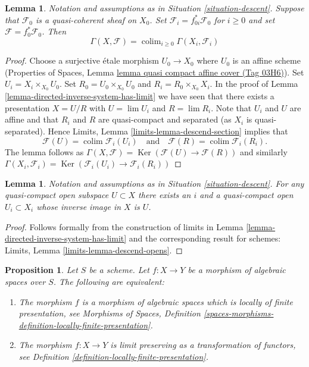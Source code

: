\documentclass{amsart}
\theoremstyle{plain}
\newtheorem{proposition}[subsection]{Proposition}
\newtheorem{lemma}[subsection]{Lemma}
\theoremstyle{definition}
\theoremstyle{remark}
\numberwithin{equation}{subsection}
\def\lim{\mathop{\mathrm{lim}}\nolimits}
\def\colim{\mathop{\mathrm{colim}}\nolimits}
\def\Ker{\mathop{\mathrm{Ker}}}
\begin{document}
\begin{lemma}
\label{lemma-descend-section}
Notation and assumptions as in Situation \ref{situation-descent}.
Suppose that $\mathcal{F}_0$ is a quasi-coherent sheaf on $X_0$.
Set $\mathcal{F}_i = f_{0i}^*\mathcal{F}_0$ for $i \geq 0$ and set
$\mathcal{F} = f_0^*\mathcal{F}_0$. Then
$$
\Gamma(X, \mathcal{F}) = \colim_{i \geq 0} \Gamma(X_i, \mathcal{F}_i)
$$
\end{lemma}

\begin{proof}
Choose a surjective \'etale morphism $U_0 \to X_0$ where $U_0$ is an affine
scheme (Properties of Spaces, Lemma
\href{https://stacks.math.columbia.edu/tag/03H6}{lemma quasi compact affine cover (Tag 03H6)}).
Set $U_i = X_i \times_{X_0} U_0$.
Set $R_0 = U_0 \times_{X_0} U_0$ and $R_i = R_0 \times_{X_0} X_i$.
In the proof of Lemma \ref{lemma-directed-inverse-system-has-limit} we have
seen that there exists a presentation $X = U/R$ with
$U = \lim U_i$ and $R = \lim R_i$.
Note that $U_i$ and $U$ are affine and that $R_i$ and $R$ are
quasi-compact and separated (as $X_i$ is quasi-separated). Hence
Limits, Lemma \ref{limits-lemma-descend-section}
implies that
$$
\mathcal{F}(U) = \colim \mathcal{F}_i(U_i)
\quad\text{and}\quad
\mathcal{F}(R) = \colim \mathcal{F}_i(R_i).
$$
The lemma follows as
$\Gamma(X, \mathcal{F}) = \Ker(\mathcal{F}(U) \to \mathcal{F}(R))$
and similarly
$\Gamma(X_i, \mathcal{F}_i) =
\Ker(\mathcal{F}_i(U_i) \to \mathcal{F}_i(R_i))$
\end{proof}


\begin{lemma}
\label{lemma-descend-opens}
Notation and assumptions as in Situation \ref{situation-descent}.
For any quasi-compact open subspace $U \subset X$ there exists an $i$
and a quasi-compact open $U_i \subset X_i$ whose inverse image in $X$ is $U$.
\end{lemma}

\begin{proof}
Follows formally from the construction of limits in
Lemma \ref{lemma-directed-inverse-system-has-limit}
and the corresponding result for schemes:
Limits, Lemma \ref{limits-lemma-descend-opens}.
\end{proof}


\begin{proposition}
\label{proposition-characterize-locally-finite-presentation}
Let $S$ be a scheme. Let $f : X \to Y$ be a morphism of algebraic
spaces over $S$. The following are equivalent:
\begin{enumerate}
\item The morphism $f$ is a morphism of algebraic spaces which is
locally of finite presentation, see
Morphisms of Spaces,
Definition \ref{spaces-morphisms-definition-locally-finite-presentation}.
\item The morphism $f : X \to Y$ is limit preserving as
a transformation of functors, see
Definition \ref{definition-locally-finite-presentation}.
\end{enumerate}
\end{proposition}
\end{document}
